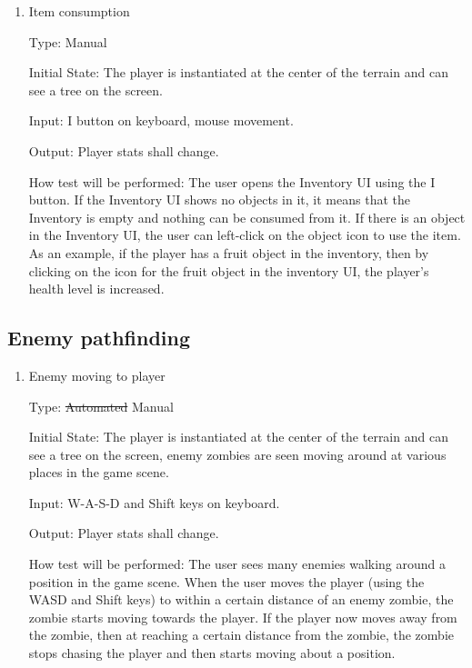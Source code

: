 \documentclass[12pt, titlepage]{article}
\DeclareRobustCommand{\hsout}[1]{\texorpdfstring{\sout{#1}}{#1}}
\begin{document}
\begin{enumerate}
\item{Item consumption\\}

Type: Manual

Initial State: The player is instantiated at the center of the terrain and can see a tree on the screen.

Input: I button on keyboard, mouse movement.

Output: Player stats shall change.

How test will be performed:
The user opens the Inventory UI using the I button. If the Inventory UI shows no objects in it, it means that the Inventory is empty and nothing can be consumed from it. If there is an object in the Inventory UI, the user can left-click on the object icon to use the item. As an example, if the player has a fruit object in the inventory, then by clicking on the icon for the fruit object in the inventory UI, the player's health level is increased. 

\end{enumerate}

\subsection{Enemy pathfinding}

\begin{enumerate}
	\item {Enemy moving to player\\}

	Type: \hsout{Automated} {\color{magenta}Manual}
	
	Initial State: The player is instantiated at the center of the terrain and can see a tree on the screen, enemy zombies are seen moving around at various places in the game scene.
	
	Input: W-A-S-D and Shift keys on keyboard.
	
	Output: Player stats shall change.
	
	How test will be performed:
	The user sees many enemies walking around a position in the game scene. When the user moves the player (using the WASD and Shift keys) to within a certain distance of an enemy zombie, the zombie starts moving towards the player. If the player now moves away from the zombie, then at reaching a certain distance from the zombie, the zombie stops chasing the player and then starts moving about a position.
	
\end{enumerate}
	
\end{document}
